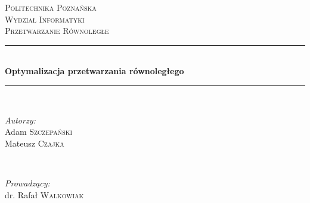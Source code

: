 \begin{titlepage}

\newcommand{\HRule}{\rule{\linewidth}{0.5mm}} %

\center %
 

\textsc{\LARGE Politechnika Poznańska}\\[1.5cm] %
\textsc{\Large Wydział Informatyki}\\[0.5cm] %
\textsc{\large Przetwarzanie Równoległe}\\[0.5cm] %


\HRule \\[0.4cm]
{ \huge \bfseries Optymalizacja przetwarzania równoległego}\\[0.4cm] %
\HRule \\[1.5cm]
 

\begin{minipage}{0.4\textwidth}
\begin{flushleft} \large
\emph{Autorzy:}\\
Adam \textsc{Szczepański} \\
Mateusz \textsc{Czajka} %
\end{flushleft}
\end{minipage}
~
\begin{minipage}{0.4\textwidth}
\begin{flushright} \large
\emph{Prowadzący:} \\
dr. Rafał \textsc{Walkowiak} %
\end{flushright}
\end{minipage}\\[2cm]


\end{titlepage}

